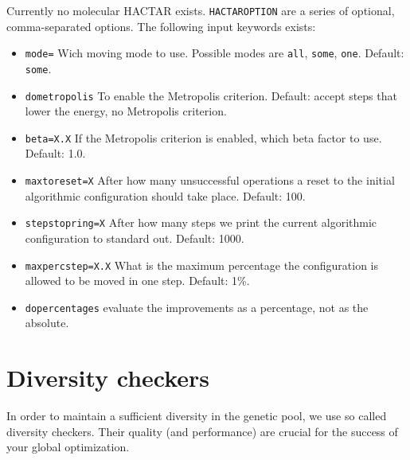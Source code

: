 \documentclass[a4paper,10pt]{scrbook}
\begin{document}
Currently no molecular 
HACTAR exists. \texttt{HACTAROPTION} are a series of optional, comma-separated 
options. The following input keywords exists:
\begin{itemize}
  \item \texttt{mode=} Wich moving mode to use. Possible modes are 
\texttt{all}, \texttt{some}, \texttt{one}. Default: \texttt{some}.
  \item \texttt{dometropolis} To enable the Metropolis criterion. Default: 
accept steps that lower the energy, no Metropolis criterion.
  \item \texttt{beta=X.X} If the Metropolis criterion is enabled, which beta 
factor to use. Default: 1.0.
  \item \texttt{maxtoreset=X} After how many unsuccessful operations a reset to 
the initial algorithmic configuration should take place. Default: 100.
  \item \texttt{stepstopring=X} After how many steps we print the current 
algorithmic configuration to standard out. Default: 1000.
  \item \texttt{maxpercstep=X.X} What is the maximum percentage the 
configuration is allowed to be moved in one step. Default: 1\%.
  \item \texttt{dopercentages} evaluate the improvements as a percentage, not
as the absolute.
\end{itemize}


\section{Diversity checkers}
In order to maintain a sufficient diversity in the genetic pool, we use so 
called
diversity checkers. Their quality (and performance) are crucial for the success 
of
your global optimization.
\end{document}
